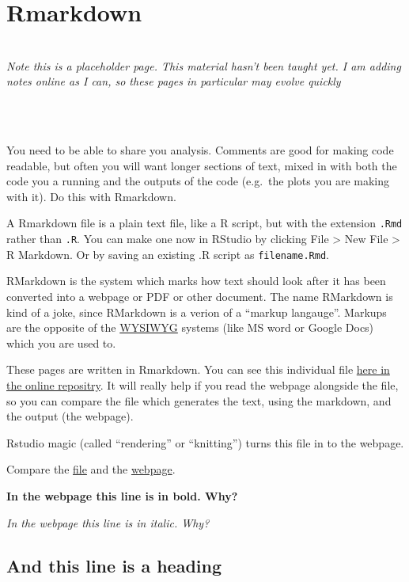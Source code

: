 \documentclass[]{book}
\author{}
\date{\vspace{-2.5em}}
\newenvironment{info}
    {
    \hline\\
    }
    { 
    \\\\\hline
    }
\begin{document}
{
\setcounter{tocdepth}{2}
\tableofcontents
}
\chapter{Rmarkdown}\label{rmarkdown}

\begin{info}
\emph{Note this is a placeholder page. This material hasn't been taught
yet. I am adding notes online as I can, so these pages in particular may
evolve quickly}
\end{info}

You need to be able to share you analysis. Comments are good for making
code readable, but often you will want longer sections of text, mixed in
with both the code you a running and the outputs of the code (e.g.~the
plots you are making with it). Do this with Rmarkdown.

A Rmarkdown file is a plain text file, like a R script, but with the
extension \texttt{.Rmd} rather than \texttt{.R}. You can make one now in
RStudio by clicking File \textgreater{} New File \textgreater{} R
Markdown. Or by saving an existing .R script as \texttt{filename.Rmd}.

RMarkdown is the system which marks how text should look after it has
been converted into a webpage or PDF or other document. The name
RMarkdown is kind of a joke, since RMarkdown is a verion of a ``markup
langauge''. Markups are the opposite of the
\href{https://en.wikipedia.org/wiki/WYSIWYG}{WYSIWYG} systems (like MS
word or Google Docs) which you are used to.

These pages are written in Rmarkdown. You can see this individual file
\href{https://github.com/tomstafford/psy6422/blob/master/008-rmarkdown.Rmd}{here
in the online repositry}. It will really help if you read the webpage
alongside the file, so you can compare the file which generates the
text, using the markdown, and the output (the webpage).

Rstudio magic (called ``rendering'' or ``knitting'') turns this file in
to the webpage.

Compare the
\href{https://github.com/tomstafford/psy6422/blob/master/008-rmarkdown.Rmd}{file}
and the
\href{https://tomstafford.github.io/psy6422/rmarkdown.html}{webpage}.

\textbf{In the webpage this line is in bold. Why?}

\emph{In the webpage this line is in italic. Why?}

\section{And this line is a heading}\label{and-this-line-is-a-heading}
\end{document}
